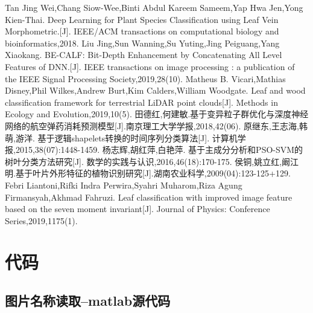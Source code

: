\documentclass{whutmod}
\begin{document}
	\newpage	%
	\nocite{*}		%
%
%	
\begin{thebibliography}{9}%
	 Tan Jing Wei,Chang Siow-Wee,Binti Abdul Kareem Sameem,Yap Hwa Jen,Yong Kien-Thai. Deep Learning for Plant Species Classification using Leaf Vein Morphometric.[J]. IEEE/ACM transactions on computational biology and bioinformatics,2018.
	Liu Jing,Sun Wanning,Su Yuting,Jing Peiguang,Yang Xiaokang. BE-CALF: Bit-Depth Enhancement by Concatenating All Level Features of DNN.[J]. IEEE transactions on image processing : a publication of the IEEE Signal Processing Society,2019,28(10).
	Matheus B. Vicari,Mathias Disney,Phil Wilkes,Andrew Burt,Kim Calders,William Woodgate. Leaf and wood classification framework for terrestrial LiDAR point clouds[J]. Methods in Ecology and Evolution,2019,10(5).
	田德红,何建敏.基于变异粒子群优化与深度神经网络的航空弹药消耗预测模型[J].南京理工大学学报,2018,42(06).
	原继东,王志海,韩萌,游洋. 基于逻辑shapelets转换的时间序列分类算法[J]. 计算机学报,2015,38(07):1448-1459.
	杨志辉,胡红萍,白艳萍. 基于主成分分析和PSO-SVM的树叶分类方法研究[J]. 数学的实践与认识,2016,46(18):170-175.
	侯铜,姚立红,阚江明.基于叶片外形特征的植物识别研究[J].湖南农业科学,2009(04):123-125+129.
	Febri Liantoni,Rifki Indra Perwira,Syahri Muharom,Riza Agung Firmansyah,Akhmad Fahruzi. Leaf classification with improved image feature based on the seven moment invariant[J]. Journal of Physics: Conference Series,2019,1175(1).
\end{thebibliography}

	\newpage
	\appendix %

\section{代码}
\subsection{图片名称读取--matlab源代码}
\begin{lstlisting}[language=matlab]

\end{lstlisting}
\end{document}
